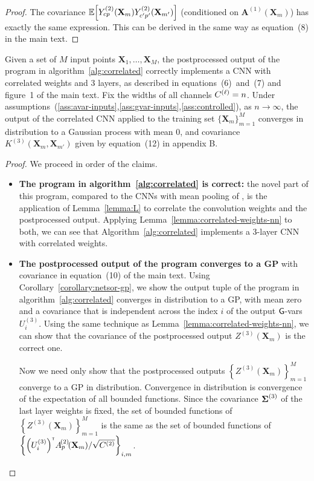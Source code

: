 \documentclass[tablecaption=bottom,wcp,nonatbib]{jmlr} %
\newcommand{\vX}{\mathbf{X}}
\newcommand{\vA}{\mathbf{A}}
\newcommand{\tp}{{\mathrm{\textsf{\tiny T}}}}
\newcommand{\bracket}[3]{{\left#1 #3 \right#2}}
\newcommand{\bra}{\bracket{(}{)}}
\newcommand{\cb}{\bracket{\{}{\}}}
\newcommand{\sqb}{\bracket{[}{]}}
\begin{document}
{{\begin{proof}
  The covariance $\ExpSymb\sqb{Y_{cp}^{(2)}(\vX_m)Y_{c' p'}^{(2)}(\vX_{m'})}$
  (conditioned on $\vA^{(1)}(\vX_m)$)
  has exactly the same expression. This can be derived in the same way as
  equation~(8) in the main text.
\end{proof}


\begin{theorem}
  Given a set of $M$ input points $\vX_1,\dots,\vX_M$,
  the postprocessed output of the \Netsor program in algorithm~\ref{alg:correlated} correctly implements a
  CNN with correlated weights and 3 layers, as described in
  equations~(6)~and~(7) and figure~1 of the main text. Fix the widths of all channels
  $C^{(\ell)} = n$.
  Under assumptions~(\ref{ass:avar-inputs},\ref{ass:gvar-inputs},\ref{ass:controlled}),
  as $n \to \infty$, the output of the correlated CNN
  applied to the training set $\{\vX_m\}_{m=1}^M$ converges in distribution to a
  Gaussian process with mean 0, and covariance $K^{(3)}(\vX_{m}, \vX_{m'})$
  given by equation~(12) in appendix B.
\label{theorem:correlated-weights-nn}
\end{theorem}
\begin{proof}
We proceed in order of the claims.
\begin{itemize}
  \item\textbf{The program in algorithm~\ref{alg:correlated} is correct:}
  the novel part of this program, compared to the CNNs with mean pooling of
  \citet[appendix~B.2]{yang2019wide}, is the application of Lemma~\ref{lemma:L}
  to correlate the convolution weights and the postprocessed output. Applying
  Lemma~\ref{lemma:correlated-weights-nn} to both, we can see that
  Algorithm~\ref{alg:correlated} implements a 3-layer CNN with correlated weights.

  \item\textbf{The postprocessed output of the program converges to a GP} with
      covariance in equation~(10) of the main text. Using
      Corollary~\ref{corollary:netsor-gp}, we show the output tuple of the
      \Netsor program in algorithm~\ref{alg:correlated} converges in
      distribution to a GP, with mean zero and a covariance that is independent across the
      index $i$ of the output $\mathsf{G}$-vars $U_i^{(3)}$. Using the same technique
      as Lemma~\ref{lemma:correlated-weights-nn}, we can show that the
      covariance of the postprocessed output $Z^{(3)}(\vX_m)$ is the correct one.

      Now we need only show that the postprocessed outputs $\cb{Z^{(3)}(\vX_m)}_{m=1}^M$
      converge to a GP in distribution. Convergence in distribution is
      convergence of the expectation of all bounded functions. Since the
      covariance $\boldsymbol{\Sigma}^{(3)}$ of the last layer weights is fixed, the set of
      bounded functions of $\cb{Z^{(3)}(\vX_m)}_{m=1}^M$ is the same as the set
      of bounded functions of $\cb{\bra{\layerUs{3}_i}^\tp \layerNLAsm{2}{\patch}{\vX_m}/\sqrt{\layerC{2}}}_{i,m}$.
\end{itemize}

\end{proof}

} %
}%
\end{document}
